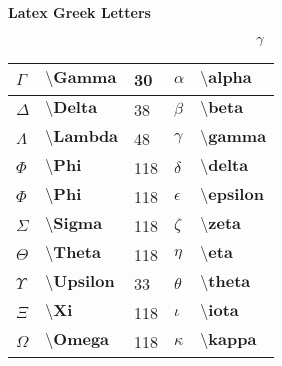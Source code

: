 \documentclass[10pt]{article}
\begin{document}
\begin{center}
\Large\textbf{Latex Greek Letters}
\end{center}
\[\gamma\]
\begin{tabular}{|l|l|l|l|l|}
\hline
$\Gamma$   &$\textbf{\textbackslash Gamma}$   &  30   & $\alpha$   & $\textbf{\textbackslash alpha}$   \\ \hline
$\Delta$   &$\textbf{\textbackslash Delta}$   &  38   & $\beta$    & $\textbf{\textbackslash beta}$    \\ \hline
$\Lambda$  &$\textbf{\textbackslash Lambda}$  &  48   & $\gamma$   & $\textbf{\textbackslash gamma}$   \\ \hline
$\Phi$     &$\textbf{\textbackslash Phi}$     &  118  & $\delta$   & $\textbf{\textbackslash delta}$   \\ \hline
$\Phi$     &$\textbf{\textbackslash Phi}$     &  118  & $\epsilon$ & $\textbf{\textbackslash epsilon}$ \\ \hline
$\Sigma$   & $\textbf{\textbackslash Sigma}$   &  118  & $\zeta$    & $\textbf{\textbackslash zeta}$    \\ \hline
$\Theta$   & $\textbf{\textbackslash Theta}$   &  118  & $\eta$     & $\textbf{\textbackslash eta}$     \\ \hline
$\Upsilon$ & $\textbf{\textbackslash Upsilon}$ &  33   & $\theta$   & $\textbf{\textbackslash theta}$   \\ \hline
$\Xi$      & $\textbf{\textbackslash Xi}$      &  118  & $\iota$    & $\textbf{\textbackslash iota}$    \\ \hline
$\Omega$   & $\textbf{\textbackslash Omega}$   &  118  & $\kappa$   & $\textbf{\textbackslash kappa}$   \\ \hline
\end{tabular}
\end{document}
